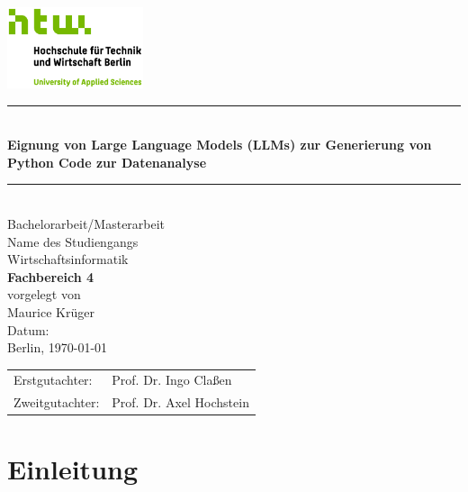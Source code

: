 \documentclass[11pt,a4paper]{article}
\begin{document}
\begin{titlepage}
    \centering
    
    \includegraphics[width=4cm]{./bilder/S04_HTW_Berlin_Logo_pos_FARBIG_RGB.jpg}\\[1.0cm]
    \rule{\linewidth}{0.5pt}\\[0.7cm]
    
    {\color{htwgreen}\bfseries\Large Eignung von Large Language Models (LLMs) zur Generierung von Python Code zur
    Datenanalyse}\\[0.5cm]
    \rule{\linewidth}{0.5pt}\\[2.0cm]
    {\large Bachelorarbeit/Masterarbeit}\\[1.5cm]
    
    {\large Name des Studiengangs}\\
    {\LARGE Wirtschaftsinformatik}\\[0.3cm]
    {\color{htwgreen}\LARGE \textbf{Fachbereich 4}}\\[1.5cm]
    
    {vorgelegt von}\\
    {\LARGE Maurice Krüger}\\[3cm]
    
    {\Large Datum:}\\
    Berlin, \today\\[2.5cm]

    {\LARGE
    \begin{tabular}{l l}
        Erstgutachter:  & Prof. Dr. Ingo Claßen \\
        Zweitgutachter: & Prof. Dr. Axel Hochstein \\
    \end{tabular}
    }

\end{titlepage}

\tableofcontents
\newpage

\section{Einleitung}
\end{document}
